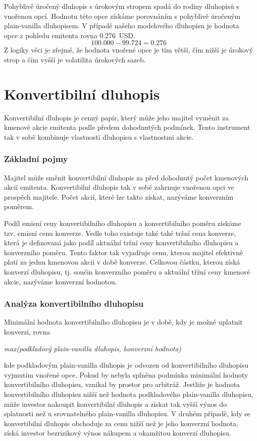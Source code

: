 \documentclass[a4paper]{book}
\begin{document}
Pohyblivě úročený dluhopis s úrokovým stropem spadá do rodiny dluhopisů s vnořenou opcí. Hodnotu této opce získáme porovnáním s pohyblivě úročeným plain-vanilla dluhopisem. V případě našeho modelového dluhopisu je hodnota opce z pohledu emitenta rovna 0.276~USD.
\begin{equation*}
100.000 - 99.724 = 0.276
\end{equation*}
Z logiky věci je zřejmé, že hodnota vnořené opce je tím větší, čím nižší je úrokový strop a čím vyšší je volatilita úrokových sazeb.

\section{Konvertibilní dluhopis}

Konvertibilní dluhopis je cenný papír, který může jeho majitel vyměnit za kmenové akcie emitenta podle předem dohodnutých podmínek. Tento instrument tak v sobě kombinuje vlastnosti dluhopisu s vlastnostmi akcie.

\subsubsection{Základní pojmy}

Majitel může směnit konvertibilní dluhopis za před dohodnutý počet kmenových akcií emitenta. Konvertibilní dluhopis tak v sobě zahrnuje vnořenou opci ve prospěch majitele. Počet akcií, které lze takto získat, nazýváme konverzním poměrem.

Podíl emisní ceny konvertibilního dluhopisu a konvertibilního poměru získáme tzv. emisní cenu konverze. Vedle toho existuje také také tržní cena konverze, která je definovaná jako  podíl aktuální tržní ceny konvertibilního dluhopisu a konverzního poměru. Tento faktor tak vyjadřuje cenu, kterou majitel efektivně platí za jednu kmenovou akcii v době konverze. Celkovou částku, kterou získá konverzí dluhopisu, tj. součin konverzního poměru a aktuální třžní ceny kmenové akcie, nazýváme konverzní hodnotou.

\subsubsection{Analýza konvertibilního dluhopisu}

Minimální hodnota konvertibilního dluhopisu je v době, kdy je možné uplatnit konverzi, rovna
\begin{center}
\textit{max(podkladový plain-vanilla dluhopis, konverzní hodnota)}
\end{center}
kde podkladovým plain-vanilla dluhopis je odvozen od konvertibilního dluhopisu vyjmutím vnořené opce. Pokud by nebyla splněna podmínka minimální hodnoty konvertibilního dluhopisu, vznikal by prostor pro arbitráž. Jestliže je hodnota konvertibilního dluhopisu nižší než hodnota podkladového plain-vanilla dluhopisu, může investor nakoupit konvertibilní dluhopis a získat tak vyšší výnos do splatnosti než u srovnatelného plain-vanilla dluhopisu. V druhém případě, kdy se konvertibilní dluhopis obchoduje za cenu nižší než je jeho konverzní hodnota, získá investor bezrizikový výnos nákupem a okamžitou konverzí dluhopisu.
\end{document}
